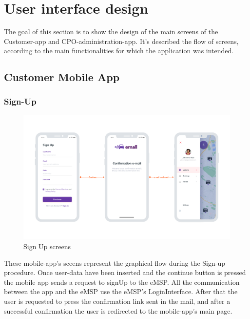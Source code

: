 \section{User interface design}
The goal of this section is to show the design of the main screens of the Customer-app and CPO-administration-app. 
It's described the flow of screens, according to the main functionalities for which the application was intended.

\subsection{Customer Mobile App}

\subsubsection{Sign-Up}
\begin{center}
    \begin{figure}[H]
        \includegraphics[width=\textwidth]{./img/design/app/Signup.png}
        \caption{Sign Up screens}
    \end{figure}
\end{center}
These mobile-app's sceens represent the graphical flow during the Sign-up procedure. Once user-data have been inserted and the continue button is pressed the mobile app sends a request to signUp to the eMSP. All the communication between the app and the eMSP use the eMSP's LoginInterface. After that the user is requested to press the confirmation link sent in the mail, and after a successful confirmation the user is redirected to the mobile-app's main page.

